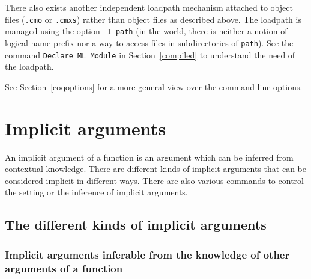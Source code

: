 There also exists another independent loadpath mechanism attached to {\ocaml}
object files (\texttt{.cmo} or \texttt{.cmxs}) rather than {\Coq} object files
as described above. The {\ocaml} loadpath is managed using the option
\texttt{-I path} (in the {\ocaml} world, there is neither a notion of logical
name prefix nor a way to access files in subdirectories of \texttt{path}).
See the command \texttt{Declare ML Module} in Section~\ref{compiled} to
understand the need of the {\ocaml} loadpath.

See Section~\ref{coqoptions} for a more general view over the {\Coq}
command line options.


\section{Implicit arguments
\label{Implicit Arguments}}

An implicit argument of a function is an argument which can be
inferred from contextual knowledge. There are different kinds of
implicit arguments that can be considered implicit in different
ways. There are also various commands to control the setting or the
inference of implicit arguments.

\subsection{The different kinds of implicit arguments}

\subsubsection{Implicit arguments inferable from the knowledge of other 
arguments of a function}

